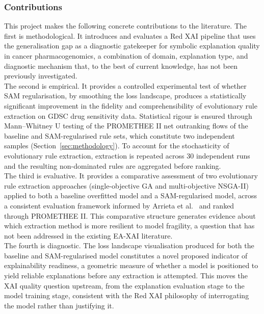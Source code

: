 \subsubsection{Contributions}
\label{ssub:contributions}

This project makes the following concrete contributions to the literature. The first is
methodological. It introduces and evaluates a Red XAI pipeline that uses the generalisation gap as a
diagnostic gatekeeper for symbolic explanation quality in cancer pharmacogenomics, a combination of
domain, explanation type, and diagnostic mechanism that, to the best of current knowledge, has not
been previously investigated.
\\
The second is empirical. It provides a controlled experimental test of whether SAM regularisation, by
smoothing the loss landscape, produces a statistically significant improvement in the fidelity and
comprehensibility of evolutionary rule extraction on GDSC drug sensitivity data. Statistical rigour is
ensured through Mann--Whitney U testing of the PROMETHEE II net outranking flows of the baseline and
SAM-regularised rule sets, which constitute two independent samples (Section~\ref{sec:methodology}).
To account for the stochasticity of evolutionary rule extraction, extraction is repeated across 30
independent runs and the resulting non-dominated rules are aggregated before ranking.
\\
The third is evaluative. It provides a comparative assessment of two evolutionary rule extraction
approaches (single-objective GA and multi-objective NSGA-II) applied to both a baseline overfitted
model and a SAM-regularised model, across a consistent evaluation framework informed by Arrieta et
al.~\cite{Arrieta2020} and ranked through PROMETHEE II. This comparative structure generates evidence
about which extraction method is more resilient to model fragility, a question that has not been
addressed in the existing EA-XAI literature.
\\
The fourth is diagnostic. The loss landscape visualisation produced for both the baseline and
SAM-regularised model constitutes a novel proposed indicator of explainability readiness, a geometric
measure of whether a model is positioned to yield reliable explanations before any extraction is
attempted. This moves the XAI quality question upstream, from the explanation evaluation stage to the
model training stage, consistent with the Red XAI philosophy of interrogating the model rather than
justifying it.